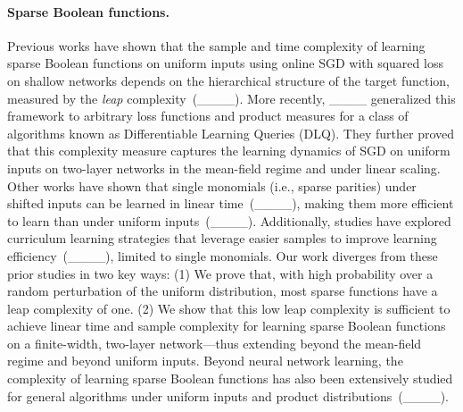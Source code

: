




\paragraph{Sparse Boolean functions.} 
Previous works have shown that the sample and time complexity of learning sparse Boolean functions on uniform inputs using online SGD with squared loss on shallow networks depends on the hierarchical structure of the target function, measured by the \textit{leap} complexity~(____). More recently, ____ generalized this framework to arbitrary loss functions and product measures for a class of algorithms known as Differentiable Learning Queries (DLQ). They further proved that this complexity measure captures the learning dynamics of SGD on uniform inputs on two-layer networks in the mean-field regime and under linear scaling. Other works have shown that single monomials (i.e., sparse parities) under shifted inputs can be learned in linear time~(____), making them more efficient to learn than under uniform inputs~(____). Additionally, studies have explored curriculum learning strategies that leverage easier samples to improve learning efficiency~(____), limited to single monomials. Our work diverges from these prior studies in two key ways: (1) We prove that, with high probability over a random perturbation of the uniform distribution, most sparse functions have a leap complexity of one. (2) We show that this low leap complexity is sufficient to achieve linear time and sample complexity for learning sparse Boolean functions on a finite-width, two-layer network—thus extending beyond the mean-field regime and beyond uniform inputs. Beyond neural network learning, the complexity of learning sparse Boolean functions has also been extensively studied for general algorithms under uniform inputs and product distributions~(____).